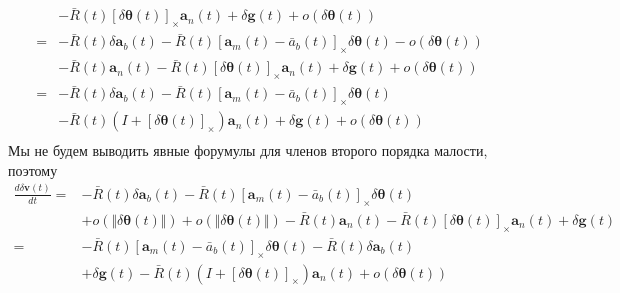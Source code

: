 \documentclass[12pt]{article}
\begin{document}
\begin{equation}
\begin{aligned}
          &
        - \bar{R}(t)[\delta\pmb{\theta}(t)]_\times \pmb{a}_{n}(t)
        + \delta\pmb{g}(t)
        + o(\delta\pmb{\theta}(t))                                                                                 \\
        = &
        - \bar{R}(t) \delta\pmb{a}_{b}(t)
        - \bar{R}(t)[\pmb{a}_{m}(t) - \bar{a}_b(t)]_\times \delta\pmb{\theta}(t)
        - o(\delta\pmb{\theta}(t))                                                                                 \\
          &
        - \bar{R}(t) \pmb{a}_{n}(t)
        - \bar{R}(t)[\delta\pmb{\theta}(t)]_\times \pmb{a}_{n}(t)
        + \delta\pmb{g}(t)
        + o(\delta\pmb{\theta}(t))                                                                                 \\
        = &
        - \bar{R}(t) \delta\pmb{a}_{b}(t)
        - \bar{R}(t)[\pmb{a}_{m}(t) - \bar{a}_b(t)]_\times \delta\pmb{\theta}(t)                                   \\
          &
        - \bar{R}(t)(I+[\delta\pmb{\theta}(t)]_\times) \pmb{a}_{n}(t)
        + \delta\pmb{g}(t)
        + o(\delta\pmb{\theta}(t))                                                                                 \\
    \end{aligned}
\end{equation}
Мы не будем выводить явные форумулы для членов второго порядка малости, поэтому
\begin{equation}
    \begin{aligned}
        \frac{d \delta \pmb{v}(t)}{dt}
        = & -\bar{R}(t)\delta\pmb{a}_b(t)
        -\bar{R}(t)[\pmb{a}_m(t) - \bar{a}_b(t)]_\times \delta\pmb{\theta}(t)      \\
          & + o(\Vert\delta\pmb{\theta}(t)\Vert)
        + o(\Vert\delta\pmb{\theta}(t)\Vert)
        - \bar{R}(t)\pmb{a}_n(t)
        - \bar{R}(t)[\delta\pmb{\theta}(t)]_\times\pmb{a}_n(t)
        + \delta \pmb{g}(t)                                                        \\
        = & - \bar{R}(t)[\pmb{a}_m(t) - \bar{a}_b(t)]_\times \delta\pmb{\theta}(t)
        - \bar{R}(t)\delta\pmb{a}_b(t)                                             \\
          & + \delta \pmb{g}(t)
        - \bar{R}(t)(I+[\delta\pmb{\theta}(t)]_\times)\pmb{a}_n(t)
        + o(\delta\pmb{\theta}(t))                                                 \\
    \end{aligned}
\end{equation}
\end{document}
